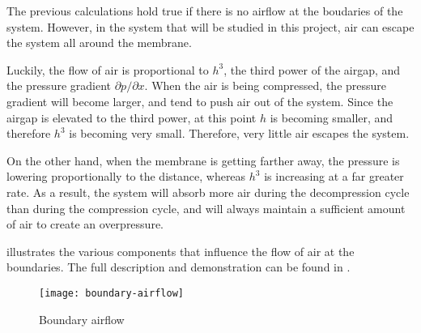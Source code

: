 The previous calculations hold true if there is no airflow at the boudaries of
the system. However, in the system that will be studied in this project, air can
escape the system all around the membrane. 

Luckily, the flow of air is proportional to $h^3$, the third power of the
airgap, and the pressure gradient $\partial p / \partial x$. When the air is
being compressed, the pressure gradient will become larger, and tend to push air
out of the system. Since the airgap is elevated to the third power, at this
point $h$ is becoming smaller, and therefore $h^3$ is becoming very small.
Therefore, very little air escapes the system.

On the other hand, when the membrane is getting farther away, the pressure is
lowering proportionally to the distance, whereas $h^3$ is increasing at a far
greater rate. As a result, the system will absorb more air during the
decompression cycle than during the compression cycle, and will always maintain
a sufficient amount of air to create an overpressure.

 illustrates the various components that influence the
flow of air at the boundaries. The full description and demonstration can be
found in \cite{wiesendanger2001}.

\begin{figure}[h]
  \begin{center}
    \texttt{[image: boundary-airflow]}
  \end{center}
  \caption{Boundary airflow\cite{wiesendanger2001}}
  \label{fig:boundary-airflow}
\end{figure}


